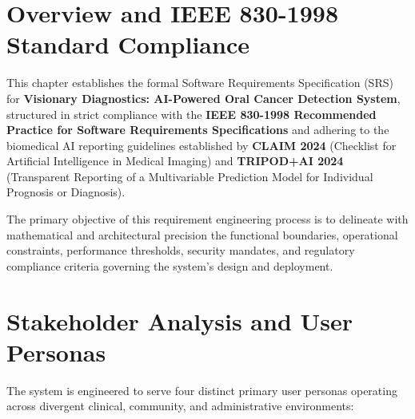 \documentclass[12pt,a4paper,oneside]{report}
\begin{document}
\section{Overview and IEEE 830-1998 Standard Compliance}
\label{sec:srs_overview}

This chapter establishes the formal Software Requirements Specification (SRS) for \textbf{Visionary Diagnostics: AI-Powered Oral Cancer Detection System}, structured in strict compliance with the \textbf{IEEE 830-1998 Recommended Practice for Software Requirements Specifications} and adhering to the biomedical AI reporting guidelines established by \textbf{CLAIM 2024} (Checklist for Artificial Intelligence in Medical Imaging) and \textbf{TRIPOD+AI 2024} (Transparent Reporting of a Multivariable Prediction Model for Individual Prognosis or Diagnosis).

The primary objective of this requirement engineering process is to delineate with mathematical and architectural precision the functional boundaries, operational constraints, performance thresholds, security mandates, and regulatory compliance criteria governing the system's design and deployment.

\section{Stakeholder Analysis and User Personas}
\label{sec:stakeholder_analysis}

The system is engineered to serve four distinct primary user personas operating across divergent clinical, community, and administrative environments:
\end{document}
